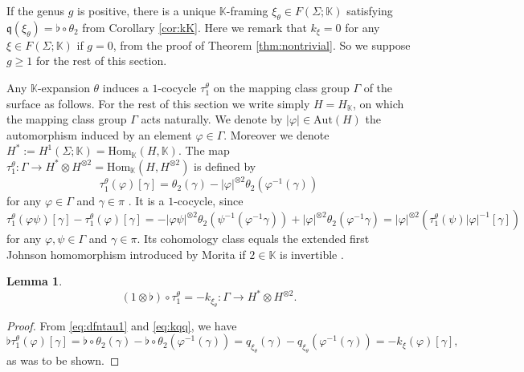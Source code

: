 \documentclass[a4paper,12pt, twoside]{amsart}
\theoremstyle{definition}
\newtheorem{lem}[dfn]{Lemma}
\theoremstyle{remark}
\numberwithin{equation}{section}
\newcommand\bK{{\mathbb{K}}}
\newcommand\HK{H_{\mathbb{K}}}
\newcommand\Hom{\mathrm{Hom}}
\newcommand\inv{^{-1}}
\begin{document}
If the genus $g$ is positive, there is a unique $\bK$-framing $\xi_\theta \in F(\Sigma; \bK)$ satisfying $\mathfrak{q}(\xi_\theta) = \flat\circ\theta_2$ from Corollary \ref{cor:kK}. Here we remark that $k_\xi = 0$ for any $\xi \in F(\Sigma; \bK)$ if $g=0$, from the proof of Theorem \ref{thm:nontrivial}. So we suppose $g \geq 1$ for the rest of this section. 
\par
Any $\bK$-expansion $\theta$ induces a $1$-cocycle $\tau^\theta_1$ on the mapping class group $\Gamma$ of the surface as follows. 
For the rest of this section we write simply $H = \HK$, on which the mapping class group $\Gamma$ acts naturally. We denote by $|\varphi| \in \mathrm{Aut}(H)$ the automorphism induced by an element $\varphi \in \Gamma$. Moreover we denote $H^* := H^1(\Sigma; \bK) = \Hom_{\bK}(H, \bK)$. The map $\tau^\theta_1: \Gamma \to H^*\otimes H^{\otimes 2} = \Hom_{\bK}(H, H^{\otimes 2})$ is defined by 
\begin{equation}\label{eq:dfntau1}
\tau^\theta_1(\varphi)[\gamma] = \theta_2(\gamma) 
- |\varphi|^{\otimes 2}\theta_2(\varphi\inv(\gamma))
\end{equation}
for any $\varphi \in \Gamma$ and $\gamma \in \pi$ \cite[Lemma 2.2]{Kaw05}. 
It is a $1$-cocycle, since 
$$
\tau^\theta_1(\varphi\psi)[\gamma] - \tau^\theta_1(\varphi)[\gamma] 
= - |\varphi\psi|^{\otimes 2}\theta_2(\psi\inv(\varphi\inv\gamma))
+ |\varphi|^{\otimes 2}\theta_2(\varphi\inv\gamma)
= |\varphi|^{\otimes 2}\left(\tau^\theta_1(\psi)|\varphi|\inv[\gamma] \right)
$$
for any $\varphi, \psi \in \Gamma$ and $\gamma \in \pi$. 
Its cohomology class equals the extended first Johnson homomorphism introduced by Morita \cite{Mo93} if $2 \in \bK$ is invertible \cite{Kaw05}.
\begin{lem}\label{lem:nutau}
$$
(1\otimes \flat)\circ \tau^\theta_1 = -k_{\xi_\theta}: \Gamma \to H^*\otimes H^{\otimes 2}.
$$
\end{lem}
\begin{proof}
From \eqref{eq:dfntau1} and \eqref{eq:kqq}, we have 
$$
\flat\tau^\theta_1(\varphi)[\gamma] 
= \flat\circ\theta_2(\gamma) - \flat\circ\theta_2(\varphi\inv(\gamma))
= q_{\xi_\theta}(\gamma) - q_{\xi_\theta}(\varphi\inv(\gamma))
= - k_\xi(\varphi)[\gamma],
$$
as was to be shown.
\end{proof}
\end{document}
